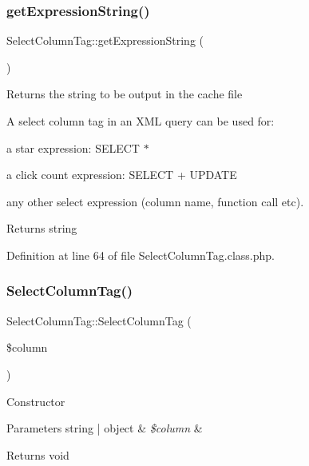\subsubsection{\texorpdfstring{get\+Expression\+String()}{getExpressionString()}}
{\footnotesize\ttfamily Select\+Column\+Tag\+::get\+Expression\+String (\begin{DoxyParamCaption}{ }\end{DoxyParamCaption})}

Returns the string to be output in the cache file

A select column tag in an X\+ML query can be used for\+: 
\begin{DoxyItemize}
\item a star expression\+: S\+E\+L\+E\+CT $\ast$ 
\item a click count expression\+: S\+E\+L\+E\+CT + U\+P\+D\+A\+TE 
\item any other select expression (column name, function call etc).  
\end{DoxyItemize}

\begin{DoxyReturn}{Returns}
string 
\end{DoxyReturn}


Definition at line 64 of file Select\+Column\+Tag.\+class.\+php.

\mbox{\label{classSelectColumnTag_a05e82794cb692f0af9a7da2eb41a229d}} 
\subsubsection{\texorpdfstring{Select\+Column\+Tag()}{SelectColumnTag()}}
{\footnotesize\ttfamily Select\+Column\+Tag\+::\+Select\+Column\+Tag (\begin{DoxyParamCaption}\item[{}]{\$column }\end{DoxyParamCaption})}

Constructor


\begin{DoxyParams}[1]{Parameters}
string | object & {\em \$column} & \\
\hline
\end{DoxyParams}
\begin{DoxyReturn}{Returns}
void 
\end{DoxyReturn}


